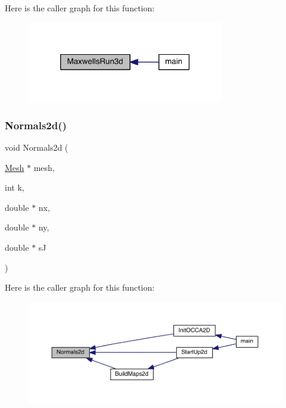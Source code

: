 Here is the caller graph for this function\+:\nopagebreak
\begin{figure}[H]
\begin{center}
\leavevmode
\includegraphics[width=242pt]{a00554_a630113a871c79c54d968c6c233e59145_icgraph}
\end{center}
\end{figure}
\mbox{\label{a00554_a6e05f4bc3238ae8e045ddc269dd77f74}} 
\subsubsection{\texorpdfstring{Normals2d()}{Normals2d()}}
{\footnotesize\ttfamily void Normals2d (\begin{DoxyParamCaption}\item[{\hyperlink{a00557_aeffbe0891ab73a4d8964c9cb7978426e}{Mesh} $\ast$}]{mesh,  }\item[{int}]{k,  }\item[{double $\ast$}]{nx,  }\item[{double $\ast$}]{ny,  }\item[{double $\ast$}]{sJ }\end{DoxyParamCaption})}

Here is the caller graph for this function\+:\nopagebreak
\begin{figure}[H]
\begin{center}
\leavevmode
\includegraphics[width=350pt]{a00554_a6e05f4bc3238ae8e045ddc269dd77f74_icgraph}
\end{center}
\end{figure}
\mbox{\label{a00554_a7dad59f4c5add70012ffb84d688ce948}} 
